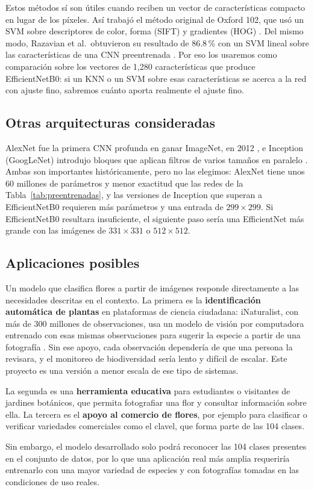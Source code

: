 Estos métodos sí son útiles cuando reciben un vector de características compacto en lugar de los píxeles. Así trabajó el método original de Oxford 102, que usó un SVM sobre descriptores de color, forma (SIFT) y gradientes (HOG) \parencite{nilsback2008}. Del mismo modo, Razavian et al.\ obtuvieron su resultado de 86.8\,\% con un SVM lineal sobre las características de una CNN preentrenada \parencite{razavian2014}. Por eso los usaremos como comparación sobre los vectores de 1,280 características que produce EfficientNetB0: si un KNN o un SVM sobre esas características se acerca a la red con ajuste fino, sabremos cuánto aporta realmente el ajuste fino.

\subsection{Otras arquitecturas consideradas}

AlexNet fue la primera CNN profunda en ganar ImageNet, en 2012 \parencite{krizhevsky2012}, e Inception (GoogLeNet) introdujo bloques que aplican filtros de varios tamaños en paralelo \parencite{szegedy2015}. Ambas son importantes históricamente, pero no las elegimos: AlexNet tiene unos 60 millones de parámetros y menor exactitud que las redes de la Tabla~\ref{tab:preentrenadas}, y las versiones de Inception que superan a EfficientNetB0 requieren más parámetros y una entrada de $299\times299$. Si EfficientNetB0 resultara insuficiente, el siguiente paso sería una EfficientNet más grande con las imágenes de $331\times331$ o $512\times512$.

\subsection{Aplicaciones posibles}

Un modelo que clasifica flores a partir de imágenes responde directamente a las necesidades descritas en el contexto. La primera es la \textbf{identificación automática de plantas} en plataformas de ciencia ciudadana: iNaturalist, con más de 300 millones de observaciones, usa un modelo de visión por computadora entrenado con esas mismas observaciones para sugerir la especie a partir de una fotografía \parencite{inaturalist}. Sin ese apoyo, cada observación dependería de que una persona la revisara, y el monitoreo de biodiversidad sería lento y difícil de escalar. Este proyecto es una versión a menor escala de ese tipo de sistemas.

La segunda es una \textbf{herramienta educativa} para estudiantes o visitantes de jardines botánicos, que permita fotografiar una flor y consultar información sobre ella. La tercera es el \textbf{apoyo al comercio de flores}, por ejemplo para clasificar o verificar variedades comerciales como el clavel, que forma parte de las 104 clases.

Sin embargo, el modelo desarrollado solo podrá reconocer las 104 clases presentes en el conjunto de datos, por lo que una aplicación real más amplia requeriría entrenarlo con una mayor variedad de especies y con fotografías tomadas en las condiciones de uso reales.
